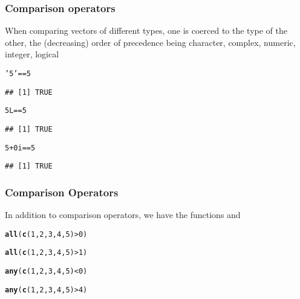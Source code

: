 \documentclass[12pt]{beamer}\usepackage[]{graphicx}\usepackage[]{color}
\makeatletter
\newcommand{\hlnum}[1]{\textcolor[rgb]{0.686,0.059,0.569}{#1}}%
\newcommand{\hlstr}[1]{\textcolor[rgb]{0.192,0.494,0.8}{#1}}%
\newcommand{\hlopt}[1]{\textcolor[rgb]{0,0,0}{#1}}%
\newcommand{\hlstd}[1]{\textcolor[rgb]{0.345,0.345,0.345}{#1}}%
\newcommand{\hlkwd}[1]{\textcolor[rgb]{0.737,0.353,0.396}{\textbf{#1}}}%
\newenvironment{kframe}{%
 \def\at@end@of@kframe{}%
 \ifinner\ifhmode%
  \def\at@end@of@kframe{\end{minipage}}%
  \begin{minipage}{\columnwidth}%
 \fi\fi%
 \def\FrameCommand##1{\hskip\@totalleftmargin \hskip-\fboxsep
 \colorbox{shadecolor}{##1}\hskip-\fboxsep
     \hskip-\linewidth \hskip-\@totalleftmargin \hskip\columnwidth}%
 \MakeFramed {\advance\hsize-\width
   \@totalleftmargin\z@ \linewidth\hsize
   \@setminipage}}%
 {\par\unskip\endMakeFramed%
 \at@end@of@kframe}
\newenvironment{knitrout}{}{} %
\makeatother
\begin{document}
\begin{frame}[fragile]
\frametitle{Comparison operators}

When comparing vectors of different types, one is coerced to the type of the other, the (decreasing) order of precedence being character, complex, numeric, integer, logical

\begin{knitrout}\footnotesize
{}\color{fgcolor}\begin{kframe}
\begin{alltt}
\hlstr{'5'} \hlopt{==} \hlnum{5}
\end{alltt}
\begin{verbatim}
## [1] TRUE
\end{verbatim}
\begin{alltt}
\hlnum{5L} \hlopt{==} \hlnum{5}
\end{alltt}
\begin{verbatim}
## [1] TRUE
\end{verbatim}
\begin{alltt}
\hlnum{5} \hlopt{+} \hlnum{0i} \hlopt{==} \hlnum{5}
\end{alltt}
\begin{verbatim}
## [1] TRUE
\end{verbatim}
\end{kframe}
\end{knitrout}

\end{frame}


\begin{frame}[fragile]
\frametitle{Comparison Operators}

In addition to comparison operators, we have the functions  and 
\begin{knitrout}\footnotesize
{}\color{fgcolor}\begin{kframe}
\begin{alltt}
\hlkwd{all}\hlstd{(}\hlkwd{c}\hlstd{(}\hlnum{1}\hlstd{,} \hlnum{2}\hlstd{,} \hlnum{3}\hlstd{,} \hlnum{4}\hlstd{,} \hlnum{5}\hlstd{)} \hlopt{>} \hlnum{0}\hlstd{)}

\hlkwd{all}\hlstd{(}\hlkwd{c}\hlstd{(}\hlnum{1}\hlstd{,} \hlnum{2}\hlstd{,} \hlnum{3}\hlstd{,} \hlnum{4}\hlstd{,} \hlnum{5}\hlstd{)} \hlopt{>} \hlnum{1}\hlstd{)}

\hlkwd{any}\hlstd{(}\hlkwd{c}\hlstd{(}\hlnum{1}\hlstd{,} \hlnum{2}\hlstd{,} \hlnum{3}\hlstd{,} \hlnum{4}\hlstd{,} \hlnum{5}\hlstd{)} \hlopt{<} \hlnum{0}\hlstd{)}

\hlkwd{any}\hlstd{(}\hlkwd{c}\hlstd{(}\hlnum{1}\hlstd{,} \hlnum{2}\hlstd{,} \hlnum{3}\hlstd{,} \hlnum{4}\hlstd{,} \hlnum{5}\hlstd{)} \hlopt{>} \hlnum{4}\hlstd{)}
\end{alltt}
\end{kframe}
\end{knitrout}

\end{frame}
\end{document}
